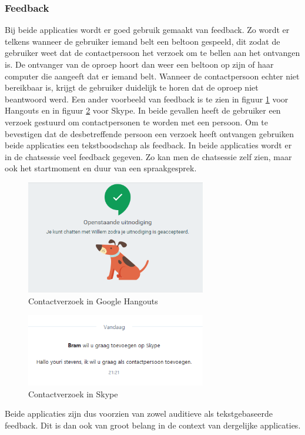 \documentclass[11pt]{article}
\begin{document}
\subsubsection{Feedback}
Bij beide applicaties wordt er goed gebruik gemaakt van feedback. Zo wordt er telkens wanneer de gebruiker iemand belt een beltoon gespeeld, dit zodat de gebruiker weet dat de contactpersoon het verzoek om te bellen aan het ontvangen is. De ontvanger van de oproep hoort dan weer een beltoon op zijn of haar computer die aangeeft dat er iemand belt. Wanneer de contactpersoon echter niet bereikbaar is, krijgt de gebruiker duidelijk te horen dat de oproep niet beantwoord werd.
\newline
Een ander voorbeeld van feedback is te zien in figuur \ref{fig:VerzoekHangouts} voor Hangouts en in figuur \ref{fig:VerzoekSkype} voor Skype. In beide gevallen heeft de gebruiker een verzoek gestuurd om contactpersonen te worden met een persoon. Om te bevestigen dat de desbetreffende persoon een verzoek heeft ontvangen gebruiken beide applicaties een tekstboodschap als feedback. In beide applicaties wordt er in de chatsessie veel feedback gegeven. Zo kan men de chatsessie zelf zien, maar ook het startmoment en duur van een spraakgesprek.
\begin{figure}
	\centering
	\includegraphics[width=0.7\textwidth]{Bram_ScreenshotGH2.png}
	\caption{Contactverzoek in Google Hangouts}
	\label{fig:VerzoekHangouts}
\end{figure}
\begin{figure}
	\centering
	\includegraphics[width=0.7\textwidth]{Bram_ScreenshotSkype2.png}
	\caption{Contactverzoek in Skype}
	\label{fig:VerzoekSkype}
\end{figure}
\newline
Beide applicaties zijn dus voorzien van zowel auditieve als tekstgebaseerde feedback. Dit is dan ook van groot belang in de context van dergelijke applicaties.
\end{document}

